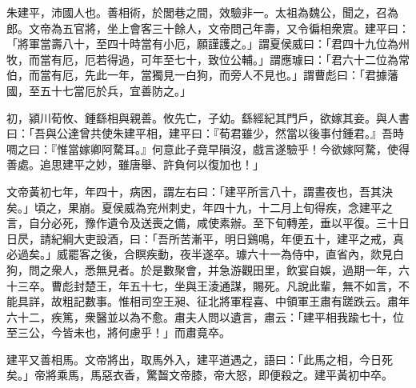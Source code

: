
\begin{pinyinscope}
朱建平，沛國人也。善相術，於閭巷之間，效驗非一。太祖為魏公，聞之，召為郎。文帝為五官將，坐上會客三十餘人，文帝問己年壽，又令徧相衆賔。建平曰：「將軍當壽八十，至四十時當有小厄，願謹護之。」謂夏侯威曰：「君四十九位為州牧，而當有厄，厄若得過，可年至七十，致位公輔。」謂應璩曰：「君六十二位為常伯，而當有厄，先此一年，當獨見一白狗，而旁人不見也。」謂曹彪曰：「君據藩國，至五十七當厄於兵，宜善防之。」

初，潁川荀攸、鍾繇相與親善。攸先亡，子幼。繇經紀其門戶，欲嫁其妾。與人書曰：「吾與公達曾共使朱建平相，建平曰：『荀君雖少，然當以後事付鍾君。』吾時啁之曰：『惟當嫁卿阿騖耳。』何意此子竟早隕沒，戲言遂驗乎！今欲嫁阿騖，使得善處。追思建平之妙，雖唐舉、許負何以復加也！」

文帝黃初七年，年四十，病困，謂左右曰：「建平所言八十，謂晝夜也，吾其決矣。」頃之，果崩。夏侯威為兖州刺史，年四十九，十二月上旬得疾，念建平之言，自分必死，豫作遺令及送喪之備，咸使素辦。至下旬轉差，垂以平復。三十日日昃，請紀綱大吏設酒，曰：「吾所苦漸平，明日鷄鳴，年便五十，建平之戒，真必過矣。」威罷客之後，合瞑疾動，夜半遂卒。璩六十一為侍中，直省內，欻見白狗，問之衆人，悉無見者。於是數聚會，并急游觀田里，飲宴自娛，過期一年，六十三卒。曹彪封楚王，年五十七，坐與王淩通謀，賜死。凡說此輩，無不如言，不能具詳，故粗記數事。惟相司空王昶、征北將軍程喜、中領軍王肅有蹉跌云。肅年六十二，疾篤，衆醫並以為不愈。肅夫人問以遺言，肅云：「建平相我踰七十，位至三公，今皆未也，將何慮乎！」而肅竟卒。

建平又善相馬。文帝將出，取馬外入，建平道遇之，語曰：「此馬之相，今日死矣。」帝將乘馬，馬惡衣香，驚齧文帝膝，帝大怒，即便殺之。建平黃初中卒。


\end{pinyinscope}